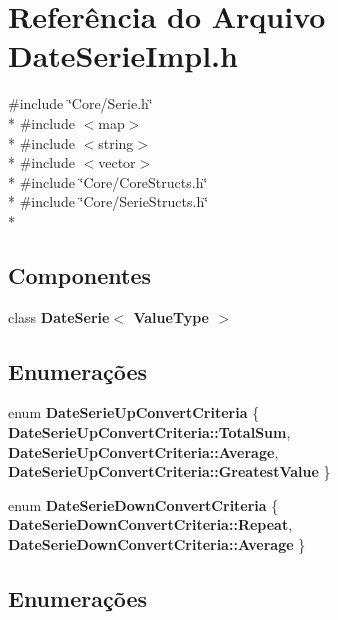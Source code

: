 \section{Referência do Arquivo Date\+Serie\+Impl.\+h}
\label{_date_serie_impl_8h}
{\ttfamily \#include \char`\"{}Core/\+Serie.\+h\char`\"{}}\\*
{\ttfamily \#include $<$map$>$}\\*
{\ttfamily \#include $<$string$>$}\\*
{\ttfamily \#include $<$vector$>$}\\*
{\ttfamily \#include \char`\"{}Core/\+Core\+Structs.\+h\char`\"{}}\\*
{\ttfamily \#include \char`\"{}Core/\+Serie\+Structs.\+h\char`\"{}}\\*
\subsection*{Componentes}
\begin{DoxyCompactItemize}
\item 
class {\bf Date\+Serie$<$ Value\+Type $>$}
\end{DoxyCompactItemize}
\subsection*{Enumerações}
\begin{DoxyCompactItemize}
\item 
enum {\bf Date\+Serie\+Up\+Convert\+Criteria} \{ {\bf Date\+Serie\+Up\+Convert\+Criteria\+::\+Total\+Sum}, 
{\bf Date\+Serie\+Up\+Convert\+Criteria\+::\+Average}, 
{\bf Date\+Serie\+Up\+Convert\+Criteria\+::\+Greatest\+Value}
 \}
\item 
enum {\bf Date\+Serie\+Down\+Convert\+Criteria} \{ {\bf Date\+Serie\+Down\+Convert\+Criteria\+::\+Repeat}, 
{\bf Date\+Serie\+Down\+Convert\+Criteria\+::\+Average}
 \}
\end{DoxyCompactItemize}


\subsection{Enumerações}
